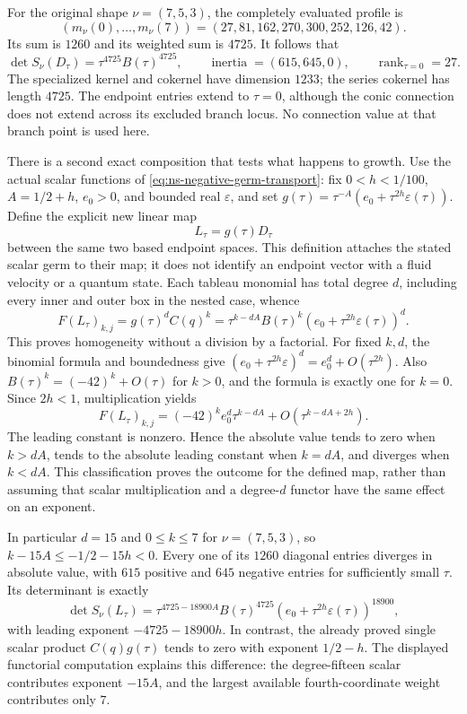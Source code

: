 For the original shape $\nu=(7,5,3)$, the completely evaluated profile is
\[
 (m_\nu(0),\ldots,m_\nu(7))
 =(27,81,162,270,300,252,126,42).
\]
Its sum is $1260$ and its weighted sum is $4725$. It follows that
\begin{equation}\label{eq:ns-schur-source-path-data}
 \det S_\nu(D_\tau)=\tau^{4725}B(\tau)^{4725},\qquad
 \operatorname{inertia}=(615,645,0),\qquad
 \operatorname{rank}_{\tau=0}=27.
\end{equation}
The specialized kernel and cokernel have dimension $1233$; the series
cokernel has length $4725$. The endpoint entries extend to $\tau=0$,
although the conic connection does not extend across its excluded
branch locus. No connection value at that branch point is used here.

There is a second exact composition that tests what happens to growth.
Use the actual scalar functions of \eqref{eq:ns-negative-germ-transport}:
fix $0<h<1/100$, $A=1/2+h$, $e_0>0$, and bounded real $\varepsilon$,
and set $g(\tau)=\tau^{-A}(e_0+\tau^{2h}\varepsilon(\tau))$.
Define the explicit new linear map
\[
 L_\tau=g(\tau)D_\tau
\]
between the same two based endpoint spaces. This definition attaches
the stated scalar germ to their map; it does not identify an endpoint
vector with a fluid velocity or a quantum state. Each tableau monomial
has total degree $d$, including every inner and outer box in the nested
case, whence
\begin{equation}\label{eq:ns-schur-growth-exponents}
 F(L_\tau)_{k,j}
 =g(\tau)^d C(q)^k
 =\tau^{k-dA}B(\tau)^k
       (e_0+\tau^{2h}\varepsilon(\tau))^d.
\end{equation}
This proves homogeneity without a division by a factorial. For fixed
$k,d$, the binomial formula and boundedness give
$(e_0+\tau^{2h}\varepsilon)^d=e_0^d+O(\tau^{2h})$.
Also $B(\tau)^k=(-42)^k+O(\tau)$ for $k>0$, and the formula is
exactly one for $k=0$. Since $2h<1$, multiplication yields
\[
 F(L_\tau)_{k,j}
 =(-42)^k e_0^d\tau^{k-dA}
       +O(\tau^{k-dA+2h}).
\]
The leading constant is nonzero. Hence the absolute value tends to
zero when $k>dA$, tends to the absolute leading constant when $k=dA$,
and diverges when $k<dA$. This classification proves the outcome for
the defined map, rather than assuming that scalar multiplication and
a degree-$d$ functor have the same effect on an exponent.

In particular $d=15$ and $0\leq k\leq7$ for $\nu=(7,5,3)$, so
$k-15A\leq-1/2-15h<0$. Every one of its $1260$ diagonal entries
diverges in absolute value, with $615$ positive and $645$ negative
entries for sufficiently small $\tau$. Its determinant is exactly
\[
 \det S_\nu(L_\tau)
 =\tau^{4725-18900A}B(\tau)^{4725}
       (e_0+\tau^{2h}\varepsilon(\tau))^{18900},
\]
with leading exponent $-4725-18900h$. In contrast, the already proved
single scalar product $C(q)g(\tau)$ tends to zero with exponent
$1/2-h$. The displayed functorial computation explains this difference:
the degree-fifteen scalar contributes exponent $-15A$, and the largest
available fourth-coordinate weight contributes only $7$.

